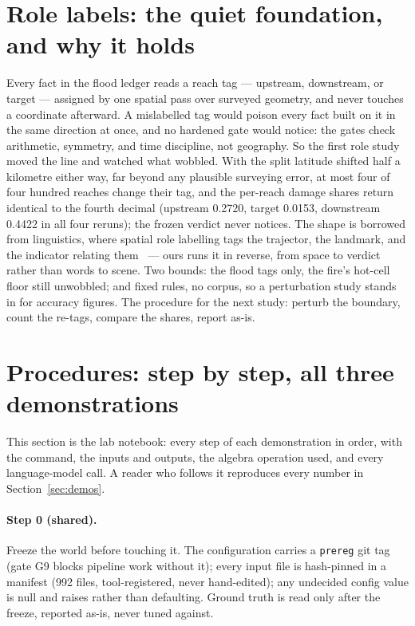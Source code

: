 \documentclass[11pt]{article}
\begin{document}
\section{Role labels: the quiet foundation, and why it holds}
\label{sec:roles}

Every fact in the flood ledger reads a reach tag --- upstream, downstream, or
target --- assigned by one spatial pass over surveyed geometry, and never
touches a coordinate afterward. A mislabelled tag would poison every fact built
on it in the same direction at once, and no hardened gate would notice: the
gates check arithmetic, symmetry, and time discipline, not geography. So the
first role study moved the line and watched what wobbled. With the split
latitude shifted half a kilometre either way, far beyond any plausible
surveying error, at most four of four hundred reaches change their tag, and
the per-reach damage shares return identical to the fourth decimal (upstream
0.2720, target 0.0153, downstream 0.4422 in all four reruns); the frozen
verdict never notices. The shape is borrowed from linguistics, where spatial
role labelling tags the trajector, the landmark, and the indicator relating
them~\cite{kordjamshidi2010} --- ours runs it in reverse, from space to
verdict rather than words to scene. Two bounds: the flood tags only, the
fire's hot-cell floor still unwobbled; and fixed rules, no corpus, so a
perturbation study stands in for accuracy figures. The procedure for the next
study: perturb the boundary, count the re-tags, compare the shares, report
as-is.

\section{Procedures: step by step, all three demonstrations}
\label{sec:procedures}

This section is the lab notebook: every step of each demonstration in order,
with the command, the inputs and outputs, the algebra operation used, and
every language-model call. A reader who follows it reproduces every number in
Section~\ref{sec:demos}.

\paragraph{Step 0 (shared).} Freeze the world before touching it. The
configuration carries a \verb|prereg| git tag (gate G9 blocks pipeline work
without it); every input file is hash-pinned in a manifest (992 files,
tool-registered, never hand-edited); any undecided config value is null and
raises rather than defaulting. Ground truth is read only after the freeze,
reported as-is, never tuned against.
\end{document}
